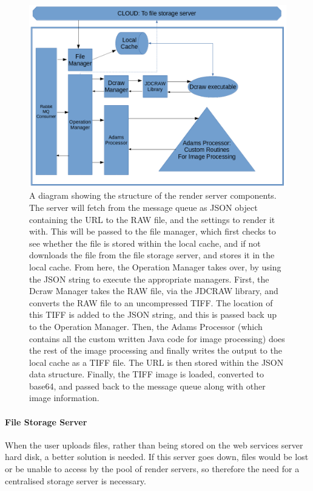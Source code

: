 \documentclass[12pt,a4paper]{article}
\begin{document}
\begin{figure}[h]
    \centering
    \includegraphics[width=1\textwidth]{renderserverdiagram}
    \caption{A diagram showing the structure of the render server components. The server will fetch from the message queue as JSON object containing the URL to the RAW file, and the settings to render it with. This will be passed to the file manager, which first checks to see whether the file is stored within the local cache, and if not downloads the file from the file storage server, and stores it in the local cache. From here, the Operation Manager takes over, by using the JSON string to execute the appropriate managers. First, the Dcraw Manager takes the RAW file, via the JDCRAW library, and converts the RAW file to an uncompressed TIFF. The location of this TIFF is added to the JSON string, and this is passed back up to the Operation Manager. Then, the Adams Processor (which contains all the custom written Java code for image processing) does the rest of the image processing and finally writes the output to the local cache as a TIFF file. The URL is then stored within the JSON data structure. Finally, the TIFF image is loaded, converted to base64, and passed back to the message queue along with other image information. }
    \label{RenderServerDiagram}
\end{figure}

\paragraph{File Storage Server}
When the user uploads files, rather than being stored on the web services server hard disk, a better solution is needed. If this server goes down, files would be lost or be unable to access by the pool of render servers, so therefore the need for a centralised storage server is necessary.
\end{document}
